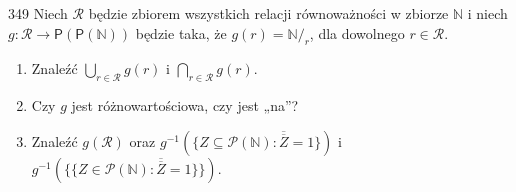 \documentclass{../note}
\begin{document}
\begin{zadanie}{349}
Niech $\mathcal{R}$ będzie zbiorem wszystkich relacji równoważności w zbiorze $\mathbb{N}$ i niech $g:\mathcal{R}\rightarrow \mathsf{P}(\mathsf{P}(\mathbb{N}))$ będzie taka, że $g(r)=\mathbb{N}/_r$, dla dowolnego $r\in\mathcal{R}$.
\begin{enumerate}
    \item[(a)] Znaleźć $\bigcup_{r\in\mathcal{R}} g(r)$ i $\bigcap_{r\in\mathcal{R}} g(r)$.
    \item[(b)] Czy $g$ jest różnowartościowa, czy jest „na”?
    \item[(c)] Znaleźć $g(\mathcal{R})$ oraz $g^{-1}(\{Z \subseteq \mathcal{P}(\mathbb{N}) : \overline{\overline{Z}} = 1\})$ i $g^{-1}(\{\{Z \in \mathcal{P}(\mathbb{N}) : \overline{\overline{Z}} = 1\}\})$.
\end{enumerate}
\end{zadanie}
\end{document}
